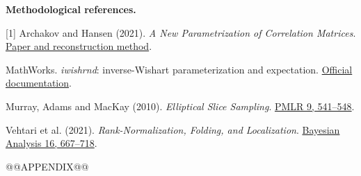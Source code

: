 \documentclass[10pt,a4paper]{article}
\begin{document}
\textbf{Methodological references.}\par
{\footnotesize
[1] Archakov and Hansen (2021). \emph{A New Parametrization of Correlation Matrices}.
\href{https://arxiv.org/abs/2012.02395}{Paper and reconstruction method}.\par
[2] MathWorks. \emph{iwishrnd}: inverse-Wishart parameterization and expectation.
\href{https://www.mathworks.com/help/stats/iwishrnd.html}{Official documentation}.\par
[3] Murray, Adams and MacKay (2010). \emph{Elliptical Slice Sampling}.
\href{https://proceedings.mlr.press/v9/murray10a.html}{PMLR 9, 541--548}.\par
[4] Vehtari et al. (2021). \emph{Rank-Normalization, Folding, and Localization}.
\href{https://arxiv.org/abs/1903.08008}{Bayesian Analysis 16, 667--718}.
}
@@APPENDIX@@
\end{document}
